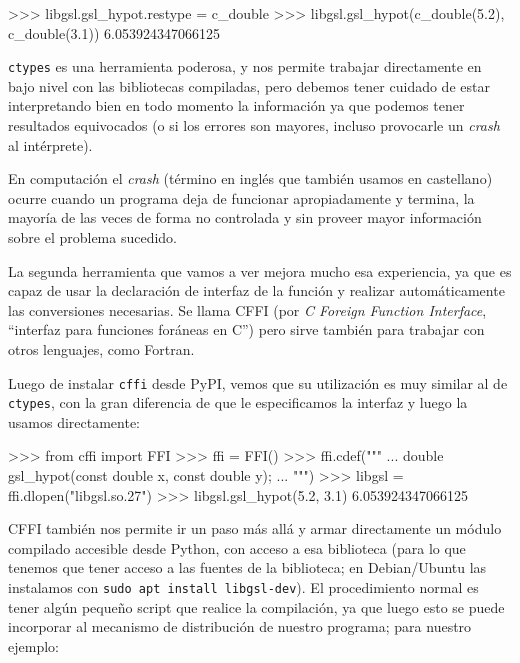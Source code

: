 \begin{py}
>>> libgsl.gsl_hypot.restype = c_double
>>> libgsl.gsl_hypot(c_double(5.2), c_double(3.1))
6.053924347066125
\end{py}

\texttt{ctypes} es una herramienta poderosa, y nos permite trabajar directamente en bajo nivel con las bibliotecas compiladas, pero debemos tener cuidado de estar interpretando bien en todo momento la información ya que podemos tener resultados equivocados (o si los errores son mayores, incluso provocarle un \textit{crash} al intérprete).

\begin{info}
En computación el \textit{crash} (término en inglés que también usamos en castellano) ocurre cuando un programa deja de funcionar apropiadamente y termina, la mayoría de las veces de forma no controlada y sin proveer mayor información sobre el problema sucedido.
\end{info}

La segunda herramienta que vamos a ver mejora mucho esa experiencia, ya que es capaz de usar la declaración de interfaz de la función y realizar automáticamente las conversiones necesarias. Se llama CFFI (por \textit{C Foreign Function Interface}, ``interfaz para funciones foráneas en C'') pero sirve también para trabajar con otros lenguajes, como Fortran.

Luego de instalar \texttt{cffi} desde PyPI, vemos que su utilización es muy similar al de \texttt{ctypes}, con la gran diferencia de que le especificamos la interfaz y luego la usamos directamente:

\begin{py}
>>> from cffi import FFI
>>> ffi = FFI()
>>> ffi.cdef("""
...   double gsl_hypot(const double x, const double y);
... """)
>>> libgsl = ffi.dlopen("libgsl.so.27")
>>> libgsl.gsl_hypot(5.2, 3.1)
6.053924347066125
\end{py}

CFFI también nos permite ir un paso más allá y armar directamente un módulo compilado accesible desde Python, con acceso a esa biblioteca (para lo que tenemos que tener acceso a las fuentes de la biblioteca; en Debian/Ubuntu las instalamos con \texttt{sudo apt install libgsl-dev}). El procedimiento normal es tener algún pequeño script que realice la compilación, ya que luego esto se puede incorporar al mecanismo de distribución de nuestro programa; para nuestro ejemplo:


